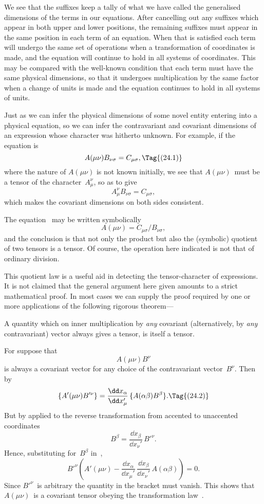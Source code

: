 \documentclass[12pt]{book}
\begin{document}
We see that the suffixes keep a tally of what we have called the generalised
dimensions of the terms in our equations. After cancelling out any suffixes
which appear in both upper and lower positions, the remaining suffixes must
appear in the same position in each term of an equation. When that is
satisfied each term will undergo the same set of operations when a transformation
of coordinates is made, and the equation will continue to hold in all
systems of coordinates. This may be compared with the well-known condition
that each term must have the same physical dimensions, so that it undergoes
multiplication by the same factor when a change of units is made and the
equation continues to hold in all systems of units.

Just as we can infer the physical dimensions of some novel entity entering
%
%
into a physical equation, so we can infer the contravariant and covariant
dimensions of an expression whose character was hitherto unknown. For
example, if the equation is
\[
A(\mu\nu) B_{\nu\sigma} = C_{\mu\sigma},
\Tag{(24.1)}
\]
where the nature of $A(\mu\nu)$ is not known initially, we see that $A(\mu\nu)$~must
be a tensor of the character~$A_{\mu}^{\nu}$, so as to give
\[
A_{\mu}^{\nu} B_{\nu\sigma} = C_{\mu\sigma},
\]
which makes the covariant dimensions on both sides consistent.

The equation~ may be written symbolically
\[
A(\mu\nu) = C_{\mu\sigma}/B_{\nu\sigma},
\]
and the conclusion is that not only the product but also the (symbolic)
quotient of two tensors is a tensor. Of course, the operation here indicated
is not that of ordinary division.

This quotient law is a useful aid in detecting the tensor\hyp{}character of
%
expressions. It is not claimed that the general argument here given amounts
to a strict mathematical proof. In most cases we can supply the proof required
by one or more applications of the following rigorous theorem---

A quantity which on inner multiplication by \emph{any} covariant (alternatively,
by \emph{any} contravariant) vector always gives a tensor, is itself a tensor.

For suppose that
\[
A(\mu\nu) B^{\nu}
\]
is always a covariant vector for any choice of the contravariant vector~$B^{\nu}$.
Then by~
\[
\{A'(\mu\nu) B'^{\nu}\}
  = \frac{\dd x_{\alpha}}{\dd x_{\mu}'}\, \{A(\alpha\beta) B^{\beta}\}.
\Tag{(24.2)}
\]
But by  applied to the reverse transformation from accented to unaccented
coordinates
\[
B^{\beta} = \frac{\dd x_{\beta}}{\dd x_{\nu}'}\, B'^{\nu}.
\]
Hence, substituting for~$B^{\beta}$ in~,
\[
B'^{\nu} \left(A'(\mu\nu) - \frac{\dd x_{\alpha}}{\dd x_{\mu}'}\, \frac{\dd x_{\beta}}{\dd x_{\nu}'}\, A(\alpha\beta)\right) = 0.
\]
Since $B'^{\nu}$~is arbitrary the quantity in the bracket must vanish. This shows
that $A(\mu\nu)$~is a covariant tensor obeying the transformation law~.
\end{document}
